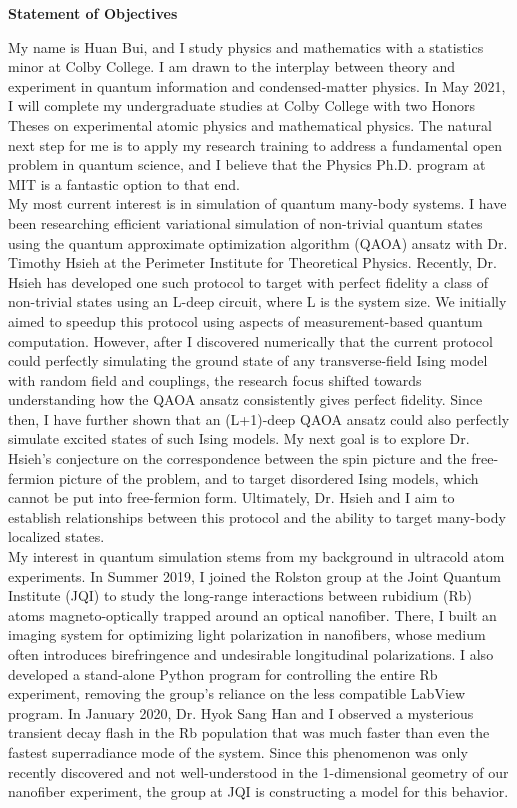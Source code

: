 \documentclass[12pt]{article}
\begin{document}
\begin{center}
	\textbf{Statement of Objectives}
\end{center}
My name is Huan Bui, and I study physics and mathematics with a statistics minor at Colby College. I am drawn to the interplay between theory and experiment in quantum information and condensed-matter physics.  In May 2021, I will complete my undergraduate studies at Colby College with two Honors Theses on experimental atomic physics and mathematical physics. The natural next step for me is to apply my research training to address a fundamental open problem in quantum science, and I believe that the Physics Ph.D. program at MIT is a fantastic option to that end.  \\ 

My most current interest is in simulation of quantum many-body systems. I have been researching efficient variational simulation of non-trivial quantum states using the quantum approximate optimization algorithm (QAOA) ansatz with Dr. Timothy Hsieh at the Perimeter Institute for Theoretical Physics. Recently, Dr. Hsieh has developed one such protocol to target with perfect fidelity a class of non-trivial states using an L-deep circuit, where L is the system size. We initially aimed to speedup this protocol using aspects of measurement-based quantum computation. However, after I discovered numerically that the current protocol could perfectly simulating the ground state of any transverse-field Ising model with random field and couplings, the research focus shifted towards understanding how the QAOA ansatz consistently gives perfect fidelity. Since then, I have further shown that an (L+1)-deep QAOA ansatz could also perfectly simulate excited states of such Ising models. My next goal is to explore Dr. Hsieh's conjecture on the correspondence between the spin picture and the free-fermion picture of the problem, and to target disordered Ising models, which cannot be put into free-fermion form. Ultimately, Dr. Hsieh and I aim to establish relationships between this protocol and the ability to target many-body localized states.\\

My interest in quantum simulation stems from my background in ultracold atom experiments. In Summer 2019, I joined the Rolston group at the Joint Quantum Institute (JQI) to study the long-range interactions between rubidium (Rb) atoms magneto-optically trapped around an optical nanofiber. There, I built an imaging system for optimizing light polarization in nanofibers, whose medium often introduces birefringence and undesirable longitudinal polarizations. I also developed a stand-alone Python program for controlling the entire Rb experiment, removing the group's reliance on the less compatible LabView program. In January 2020, Dr. Hyok Sang Han and I observed a mysterious transient decay flash in the Rb population that was much faster than even the fastest superradiance mode of the system. Since this phenomenon was only recently discovered and not well-understood in the 1-dimensional geometry of our nanofiber experiment, the group at JQI is constructing a model for this behavior.   \\ 
\end{document}
